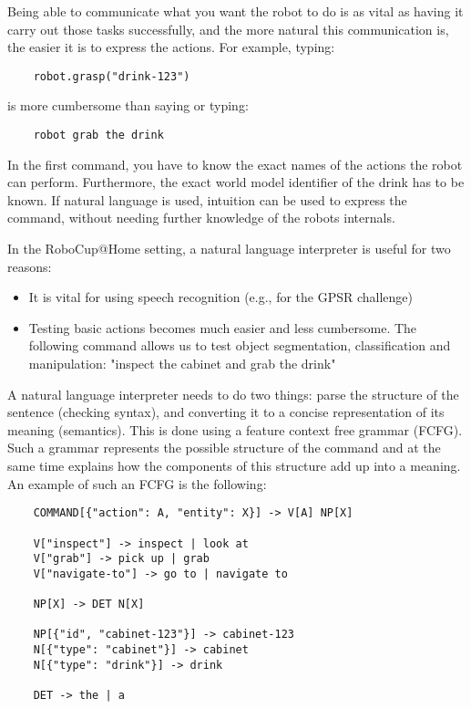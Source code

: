 Being able to communicate what you want the robot to do is as vital as having it carry out those tasks successfully, and the more natural this communication is, the easier it is to express the actions. For example, typing:

\begin{lstlisting}
    robot.grasp("drink-123")
\end{lstlisting}

is more cumbersome than saying or typing:

\begin{lstlisting}
    robot grab the drink
\end{lstlisting}

In the first command, you have to know the exact names of the actions the robot can perform. Furthermore, the exact world model identifier of the drink has to be known. If natural language is used, intuition can be used to express the command, without needing further knowledge of the robots internals.

In the RoboCup@Home setting, a natural language interpreter is useful for two reasons:

\begin{itemize}
    \item It is vital for using speech recognition (e.g., for the GPSR challenge)
    \item Testing basic actions becomes much easier and less cumbersome. The following command allows us to test object segmentation, classification and manipulation: "inspect the cabinet and grab the drink"
\end{itemize}


A natural language interpreter needs to do two things: parse the structure of the sentence (checking syntax), and converting it to a concise representation of its meaning (semantics). This is done using a feature context free grammar (FCFG). Such a grammar represents the possible structure of the command and at the same time explains how the components of this structure add up into a meaning. An example of such an FCFG is the following:

\begin{lstlisting}
    COMMAND[{"action": A, "entity": X}] -> V[A] NP[X]

    V["inspect"] -> inspect | look at
    V["grab"] -> pick up | grab       
    V["navigate-to"] -> go to | navigate to

    NP[X] -> DET N[X]

    NP[{"id", "cabinet-123"}] -> cabinet-123
    N[{"type": "cabinet"}] -> cabinet
    N[{"type": "drink"}] -> drink

    DET -> the | a
\end{lstlisting}

